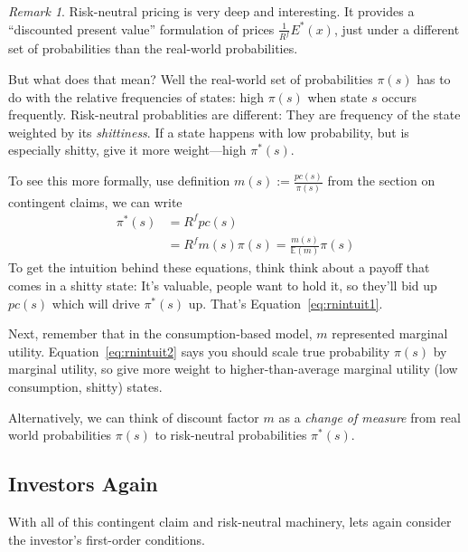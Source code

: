 \documentclass[12pt]{article}
\theoremstyle{plain}
\theoremstyle{definition}
\theoremstyle{remark}
\newtheorem*{rmk}{Remark}
\begin{document}
\begin{rmk}
Risk-neutral pricing is very deep and interesting. It provides a
``discounted present value'' formulation of prices
$\frac{1}{R^f}E^*(x)$, just under a different set of probabilities than
the real-world probabilities.

But what does that mean? Well the real-world set of probabilities
$\pi(s)$ has to do with the relative frequencies of states: high
$\pi(s)$ when state $s$ occurs frequently. Risk-neutral probablities are
different: They are frequency of the state weighted by its
\emph{shittiness}. If a state happens with low probability, but is
especially shitty, give it more weight---high $\pi^*(s)$.

To see this more formally, use definition $m(s):= \frac{pc(s)}{\pi(s)}$
from the section on contingent claims, we can write
\begin{align}
  \pi^*(s) &= R^f pc(s) \label{eq:rnintuit1}\\
  &= R^f m(s) \pi(s) = \frac{m(s)}{\mathbb{E}(m)} \pi(s)
  \label{eq:rnintuit2}
\end{align}
To get the intuition behind these equations, think think about a payoff
that comes in a shitty state: It's valuable, people want to hold it, so
they'll bid up $pc(s)$ which will drive $\pi^*(s)$ up. That's
Equation~\ref{eq:rnintuit1}.

Next, remember that in the consumption-based model, $m$ represented
marginal utility. Equation~\ref{eq:rnintuit2} says you should scale true
probability $\pi(s)$ by marginal utility, so give more weight to
higher-than-average marginal utility (low consumption, shitty) states.

Alternatively, we can think of discount factor $m$ as a \emph{change of
measure} from real world probabilities $\pi(s)$ to risk-neutral
probabilities $\pi^*(s)$.
\end{rmk}

\subsection{Investors Again}

With all of this contingent claim and risk-neutral machinery, lets again
consider the investor's first-order conditions.
\end{document}
